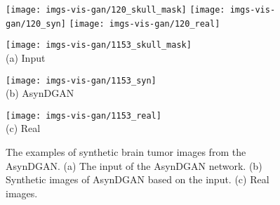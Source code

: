 \begin{figure}[t]
	\begin{center}
		\texttt{[image: imgs-vis-gan/120\_skull\_mask]}
		\texttt{[image: imgs-vis-gan/120\_syn]}
		\texttt{[image: imgs-vis-gan/120\_real]}\\ \vspace{0.01in}
		\begin{minipage}{0.3\linewidth}
			\centering\texttt{[image: imgs-vis-gan/1153\_skull\_mask]} \\ (a) Input
		\end{minipage}
		\begin{minipage}{0.3\linewidth}
			\centering\texttt{[image: imgs-vis-gan/1153\_syn]} \\ (b) AsynDGAN
		\end{minipage}
		\begin{minipage}{0.3\linewidth}
			\centering\texttt{[image: imgs-vis-gan/1153\_real]}  \\  (c) Real
		\end{minipage}
	\end{center}
	\caption{The examples of synthetic brain tumor images from the AsynDGAN. (a) The input of the AsynDGAN network. (b) Synthetic images of AsynDGAN based on the input. (c) Real images.}
	\label{fig:syn:hgg}
	\vspace{-1em}
\end{figure}

